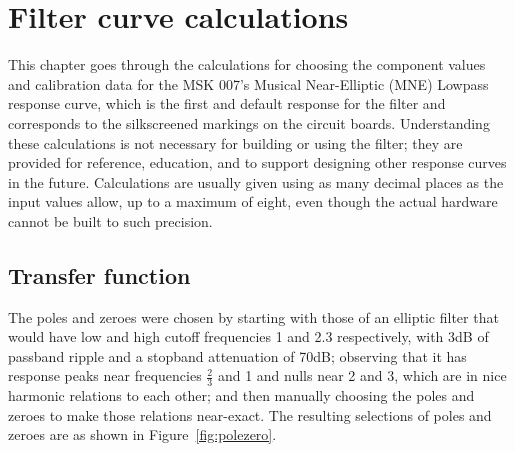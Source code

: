 
%
%
%
%
%
%

\chapter{Filter curve calculations}\label{cha:calculations}

This chapter goes through the calculations for choosing the component values
and calibration data for the MSK 007's Musical Near-Elliptic (MNE) Lowpass
response curve, which is the first and default response for the filter and
corresponds to the silkscreened markings on the circuit boards. 
Understanding these calculations is not necessary for building or using the
filter; they are provided for reference, education, and to support designing
other response curves in the future.  Calculations are usually given using
as many decimal places as the input values allow, up to a maximum of eight,
even though the actual hardware cannot be built to such precision.

\section{Transfer function}

The poles and zeroes were chosen by starting with those of an elliptic
filter that would have low and high cutoff frequencies 1 and 2.3
respectively, with 3dB of passband ripple and a stopband attenuation of
70dB; observing that it has response peaks near frequencies $\tfrac{2}{3}$
and 1 and nulls near 2 and 3, which are in nice harmonic relations to each
other; and then manually choosing the poles and zeroes to make those
relations near-exact.  The resulting selections of poles and zeroes are as
shown in Figure~\ref{fig:polezero}.

